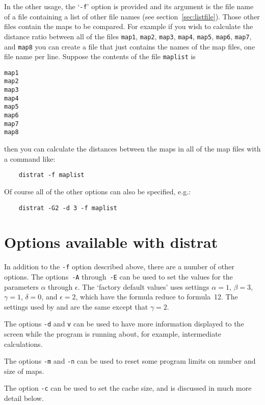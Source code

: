 \documentclass[%
	11pt,
        a4paper,
        twoside]{workrep}
\newcommand*{\prg}[1]{\textsf{#1}}		%
\newcommand*{\file}[1]{\texttt{#1}}		%
\newcommand*{\opt}[1]{\texttt{#1}}		%
\begin{document}
In the other usage, the `\texttt{-f}' option is provided and
its argument is the file name of a file containing a list of other
file names (see section~\ref{sec:listfile}).
Those other files contain the maps to be compared.  For
example if you wish to calculate the distance ratio between all of
the files \file{map1}, \file{map2}, \file{map3}, \file{map4},
\file{map5}, \file{map6}, \file{map7}, and
\file{map8} you can create a file that just contains the names of the map
files, one file name per line.  Suppose the contents of the file
\file{maplist} is 
\begin{verbatim}
map1
map2
map3
map4
map5
map6
map7
map8
\end{verbatim}
then you can calculate the distances between the maps in all
of the map files with a command like:
\begin{verbatim}
    distrat -f maplist
\end{verbatim}
Of course all of the other options can also be specified, e.g.:
\begin{verbatim}
    distrat -G2 -d 3 -f maplist
\end{verbatim}

\section{Options available with \prg{distrat}}\label{sec:dropts}

In addition to the \opt{-f} option described above, there are a number
of other options.  The options~\opt{-A} through~\opt{-E} can be used
to set the values for the parameters $\alpha$ through $\epsilon$.  The
`factory default values' uses settings $\alpha=1$, $\beta=3$, $\gamma=1$,
$\delta=0$, and $\epsilon=2$, which have the formula reduce to
 formula~12.  The settings used by
 and  are
the same except that $\gamma=2$.

The options \opt{-d} and \opt{v} can be used to have more information
displayed to the screen while the program is running about, for example,
intermediate calculations.

The options \opt{-m} and \opt{-n} can be used to reset some program
limits on number and size of maps.

The option \opt{-c} can be used to set the cache size, and is discussed
in much more  detail below.
\end{document}
